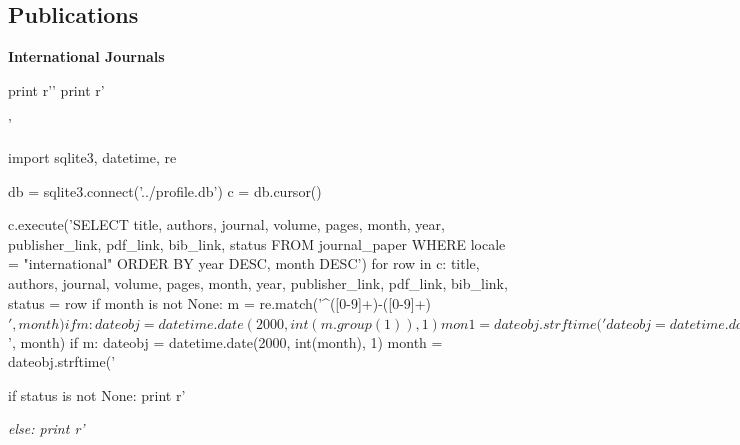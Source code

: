 \documentclass[margin,line]{res}
\newenvironment{list1}{
  \begin{list}{\ding{113}}{%
      \setlength{\itemsep}{0in}
      \setlength{\parsep}{0in} \setlength{\parskip}{0in}
      \setlength{\topsep}{0in} \setlength{\partopsep}{0in}
      \setlength{\leftmargin}{0.17in}}}{\end{list}}
\begin{document}
\begin{resume}



\section{\sc Publications}
{\bf International Journals}\\

\begin{pycode}
print r'\vspace{-.3cm}'
print r'\begin{list1}'

import sqlite3, datetime, re

db = sqlite3.connect('../profile.db')
c = db.cursor()

c.execute('SELECT title, authors, journal, volume, pages, month, year, publisher_link, pdf_link, bib_link, status FROM journal_paper WHERE locale = "international" ORDER BY year DESC, month DESC')
for row in c:
  title, authors, journal, volume, pages, month, year, publisher_link, pdf_link, bib_link, status = row
  if month is not None:
    m = re.match('^([0-9]+)-([0-9]+)$', month)
    if m:
      dateobj = datetime.date(2000, int(m.group(1)), 1)
      mon1 = dateobj.strftime('%
      dateobj = datetime.date(2000, int(m.group(2)), 1)
      mon2 = dateobj.strftime('%
      month = ', %
    else:
      m = re.match('^[0-9]+$', month)
      if m:
        dateobj = datetime.date(2000, int(month), 1)
        month = dateobj.strftime('%

  if status is not None:
    print r'\item[] {\em %
  else:
    print r'\item[] {\em %

}}
\end{list1}
\end{pycode}
\end{resume}
\end{document}
